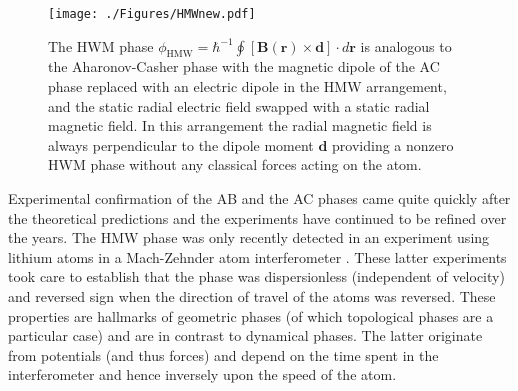 \begin{figure}[htp]
\texttt{[image: ./Figures/HMWnew.pdf]}
\caption{The HWM phase $\phi_{\mathrm{HMW}} = \hbar^{-1} \oint [\mathbf{B}(\mathbf{r}) \times \mathbf {d}] \cdot d \mathbf r $ is analogous to the Aharonov-Casher phase with the magnetic dipole of the AC phase replaced with an electric dipole in the HMW arrangement, and the static radial electric field swapped with a static radial magnetic field. In this arrangement the radial magnetic field is always perpendicular to the dipole moment $\mathbf{d}$ providing a nonzero HWM phase without any classical forces acting on the atom.}
\label{fig:hmw}
\end{figure}

Experimental confirmation of the AB \cite{chambers60,tonomura86,olariu85,peshkin89} and the AC  \cite{cimmino89,sangster93,zeiske95,gorlitz95,yanagimachi02} phases came quite quickly after the theoretical predictions and the experiments have continued to be refined over the years. The HMW phase was only recently detected in an experiment using lithium atoms in a Mach-Zehnder atom interferometer  \cite{vigue1,vigue2,vigue3,vigue4}. These latter experiments took care to establish that the phase was dispersionless (independent of velocity) and reversed sign when the direction of travel of the atoms was reversed. These properties are hallmarks of geometric phases (of which topological phases are a particular case) and are in contrast to dynamical phases. The latter originate from potentials (and thus forces) and depend on the time spent in the interferometer and hence inversely upon the speed of the atom. 


